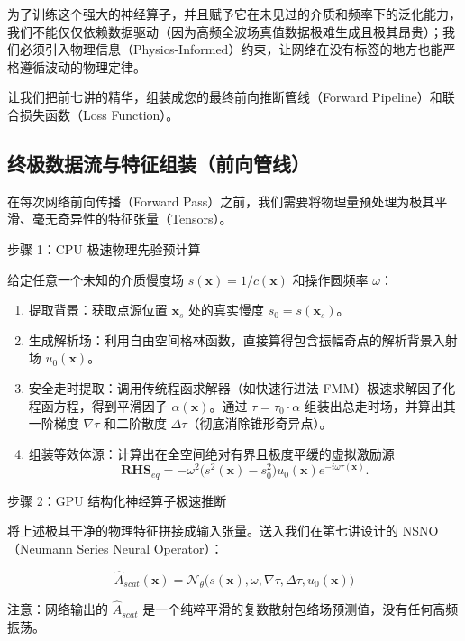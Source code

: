\documentclass[12pt]{article}
\begin{document}
{为了训练这个强大的神经算子，并且赋予它在未见过的介质和频率下的泛化能力，我们不能仅仅依赖数据驱动（因为高频全波场真值数据极难生成且极其昂贵）；我们必须引入物理信息（Physics-Informed）约束，让网络在没有标签的地方也能严格遵循波动的物理定律。

让我们把前七讲的精华，组装成您的最终前向推断管线（Forward Pipeline）和联合损失函数（Loss Function）。

\subsection{终极数据流与特征组装（前向管线）}

在每次网络前向传播（Forward Pass）之前，我们需要将物理量预处理为极其平滑、毫无奇异性的特征张量（Tensors）。

步骤 1：CPU 极速物理先验预计算

给定任意一个未知的介质慢度场 $s(\mathbf{x}) = 1/c(\mathbf{x})$ 和操作圆频率 $\omega$：

\begin{enumerate}[leftmargin=2em]
    \item 提取背景：获取点源位置 $\mathbf{x}_s$ 处的真实慢度 $s_0 = s(\mathbf{x}_s)$。
    \item 生成解析场：利用自由空间格林函数，直接算得包含振幅奇点的解析背景入射场 $u_0(\mathbf{x})$。
    \item 安全走时提取：调用传统程函求解器（如快速行进法 FMM）极速求解因子化程函方程，得到平滑因子 $\alpha(\mathbf{x})$。通过 $\tau = \tau_0 \cdot \alpha$ 组装出总走时场，并算出其一阶梯度 $\nabla \tau$ 和二阶散度 $\Delta \tau$（彻底消除锥形奇异点）。
    \item 组装等效体源：计算出在全空间绝对有界且极度平缓的虚拟激励源
    \[
    \mathbf{RHS}_{eq} = -\omega^2 \big( s^2(\mathbf{x}) - s_0^2 \big) u_0(\mathbf{x}) e^{-i \omega \tau(\mathbf{x})}.
    \]
\end{enumerate}

步骤 2：GPU 结构化神经算子极速推断

将上述极其干净的物理特征拼接成输入张量。送入我们在第七讲设计的 NSNO（Neumann Series Neural Operator）：

\begin{equation}
\hat{A}_{scat}(\mathbf{x}) = \mathcal{N}_{\theta}\Big( s(\mathbf{x}), \omega, \nabla \tau, \Delta \tau, u_0(\mathbf{x}) \Big)
\label{eq:8-1}
\end{equation}

注意：网络输出的 $\hat{A}_{scat}$ 是一个纯粹平滑的复数散射包络场预测值，没有任何高频振荡。

}
\end{document}
